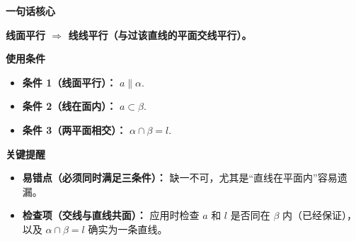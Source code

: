 \begin{summarybox}
	\textbf{\textcolor{CSummary}{一句话核心}}

	\textbf{线面平行 $\Rightarrow$ 线线平行（与过该直线的平面交线平行）。}

	\medskip
	\textbf{\textcolor{CSummary}{使用条件}}
	\begin{itemize}[leftmargin=*, itemsep=0.5em, topsep=0.4em]
		\item \textbf{条件 1（线面平行）：} $a\parallel\alpha$.
		\item \textbf{条件 2（线在面内）：} $a\subset\beta$.
		\item \textbf{条件 3（两平面相交）：} $\alpha\cap\beta=l$.
	\end{itemize}

	\medskip
	\textbf{\textcolor{CSummary}{关键提醒}}
	\begin{itemize}[leftmargin=*, itemsep=0.5em, topsep=0.4em]
		\item \textbf{易错点（必须同时满足三条件）：} 缺一不可，尤其是“直线在平面内”容易遗漏。
		\item \textbf{检查项（交线与直线共面）：} 应用时检查 $a$ 和 $l$ 是否同在 $\beta$ 内（已经保证），以及 $\alpha\cap\beta=l$ 确实为一条直线。
	\end{itemize}
\end{summarybox}
